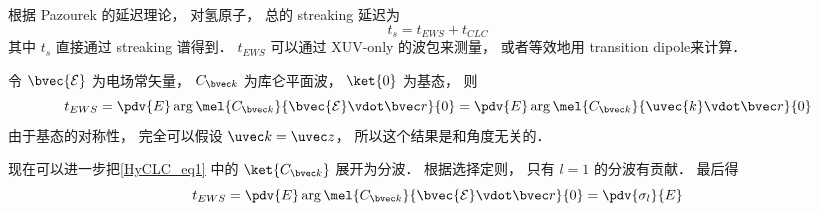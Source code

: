 
\begin{issues}
\issueDraft
\end{issues}


根据 Pazourek 的延迟理论， 对氢原子， 总的 streaking 延迟为
\begin{equation}
t_s = t_{EWS} + t_{CLC}
\end{equation}
其中 $t_s$ 直接通过 streaking 谱得到． $t_{EWS}$ 可以通过 XUV-only 的波包来测量， 或者等效地用 transition dipole来计算．

令 $\bvec{\mathcal E}$ 为电场常矢量， $C_{\bvec k}$ 为库仑平面波， $\ket{0}$ 为基态， 则
\begin{equation}\label{HyCLC_eq1}
t_{EWS} = \pdv{E} \arg \mel{C_{\bvec k}}{\bvec{\mathcal E}\vdot \bvec r}{0} = \pdv{E} \arg \mel{C_{\bvec k}}{\uvec{k}\vdot \bvec r}{0}
\end{equation}
由于基态的对称性， 完全可以假设 $\uvec k = \uvec z$， 所以这个结果是和角度无关的．

现在可以进一步把\autoref{HyCLC_eq1} 中的 $\ket{C_{\bvec k}}$ 展开为分波． 根据选择定则， 只有 $l = 1$ 的分波有贡献． 最后得
\begin{equation}
t_{EWS} = \pdv{E} \arg \mel{C_{\bvec k}}{\bvec{\mathcal E}\vdot \bvec r}{0} = \pdv{\sigma_l}{E}
\end{equation}
